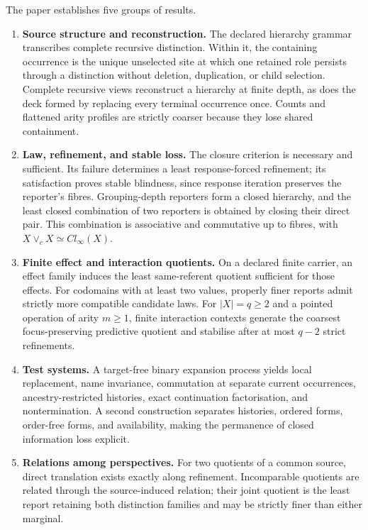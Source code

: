 \documentclass[11pt,a4paper]{article}
\begin{document}
The paper establishes five groups of results.

\begin{enumerate}
\def\labelenumi{\arabic{enumi}.}
\item
  \textbf{Source structure and reconstruction.} The declared hierarchy
  grammar transcribes complete recursive distinction. Within it, the
  containing occurrence is the unique unselected site at which one
  retained role persists through a distinction without deletion,
  duplication, or child selection. Complete recursive views reconstruct
  a hierarchy at finite depth, as does the deck formed by replacing
  every terminal occurrence once. Counts and flattened arity profiles
  are strictly coarser because they lose shared containment.
\item
  \textbf{Law, refinement, and stable loss.} The closure criterion is
  necessary and sufficient. Its failure determines a least
  response-forced refinement; its satisfaction proves stable blindness,
  since response iteration preserves the reporter's fibres.
  Grouping-depth reporters form a closed hierarchy, and the least closed
  combination of two reporters is obtained by closing their direct pair.
  This combination is associative and commutative up to fibres, with
  \(X \vee_{c}X \simeq {Cl}_{\infty}(X)\).
\item
  \textbf{Finite effect and interaction quotients.} On a declared finite
  carrier, an effect family induces the least same-referent quotient
  sufficient for those effects. For codomains with at least two values,
  properly finer reports admit strictly more compatible candidate laws.
  For \(|X| = q \geq 2\) and a pointed operation of arity \(m \geq 1\),
  finite interaction contexts generate the coarsest focus-preserving
  predictive quotient and stabilise after at most \(q - 2\) strict
  refinements.
\item
  \textbf{Test systems.} A target-free binary expansion process yields
  local replacement, name invariance, commutation at separate current
  occurrences, ancestry-restricted histories, exact continuation
  factorisation, and nontermination. A second construction separates
  histories, ordered forms, order-free forms, and availability, making
  the permanence of closed information loss explicit.
\item
  \textbf{Relations among perspectives.} For two quotients of a common
  source, direct translation exists exactly along refinement.
  Incomparable quotients are related through the source-induced
  relation; their joint quotient is the least report retaining both
  distinction families and may be strictly finer than either marginal.
\end{enumerate}
\end{document}
